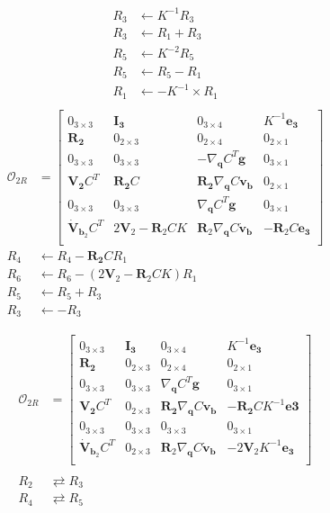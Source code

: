 \documentclass[]{article}
\begin{document}
\begin{itemize}
\begin{align*}
	\\
	R_3 &\leftarrow K^{-1}R_3\\
	R_3 &\leftarrow R_1 + R_3\\
	R_5 &\leftarrow K^{-2}R_5\\
	R_5 &\leftarrow R_5 - R_1\\
	R_1&\leftarrow -K^{-1}\times R_1\\
	\end{align*}
	\begin{align*}
	\mathcal{O}_{2R} &= \begin{bmatrix}
	0_{3\times 3}& \bm{I_3} & 0_{3\times 4}& K^{-1}\bm{e_3}\\
	\bm{R_2} & 0_{2\times 3} & 0_{2\times 4} & 0_{2\times 1}\\
	0_{3\times 3}& 0_{3\times 3}& -\nabla_{\bm{q}} C^T\bm{g}& 0_{3\times 1}\\
	\bm{V_2} C^T & \bm{R_2}C & \bm{R_2}\nabla_{\bm{q}} C\bm{v_b} & 0_{2\times 1}\\
	0_{3\times 3}& 0_{3\times 3}& \nabla_{\bm{q}} C^T\bm{g}& 0_{3\times 1}\\
	\bm{\dot{V}}_{\bm{b}_2} C^T & 2\bm{V}_2 - \bm{R}_2CK & \bm{R}_2\nabla_{\bm{q}} C\bm{\dot{v}_b} & -\bm{R}_2C\bm{e_3}\\
	\end{bmatrix}\\
	R_4 &\leftarrow R_4 - \bm{R_2}CR_1\\
	R_6 &\leftarrow R_6 - (2\bm{V}_2 - \bm{R}_2CK)R_1\\
	R_5 &\leftarrow R_5 + R_3\\
	R_3 &\leftarrow -R_3
	\end{align*}

	\begin{align*}
	\mathcal{O}_{2R} &= \begin{bmatrix}
	0_{3\times 3}& \bm{I_3} & 0_{3\times 4}& K^{-1}\bm{e_3}\\
	\bm{R_2} & 0_{2\times 3} & 0_{2\times 4} & 0_{2\times 1}\\
	0_{3\times 3}& 0_{3\times 3}& \nabla_{\bm{q}} C^T\bm{g}& 0_{3\times 1}\\
	\bm{V_2} C^T & 0_{2\times 3} & \bm{R_2}\nabla_{\bm{q}} C\bm{v_b} & -\bm{R_2}CK^{-1}\bm{e3}\\
	0_{3\times 3}& 0_{3\times 3}& 0_{3\times 3}& 0_{3\times 1}\\
	\bm{\dot{V}}_{\bm{b}_2} C^T & 0_{2\times 3} & \bm{R}_2\nabla_{\bm{q}} C\bm{\dot{v}_b} & -2\bm{V}_2K^{-1}\bm{e_3}\\
	\end{bmatrix}\\
	\\
	R_2 &\rightleftarrows R_3\\
	R_4 &\rightleftarrows R_5\\
	\end{align*}
	

\end{itemize}
\end{document}
